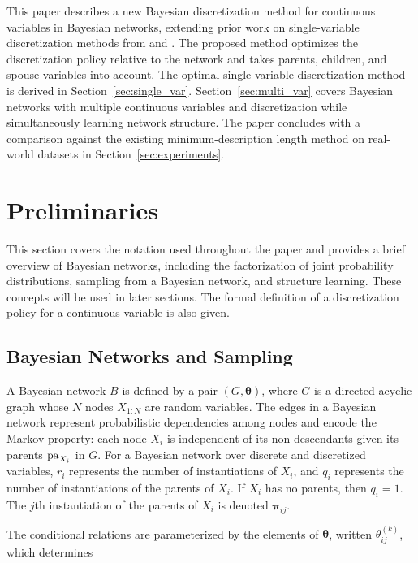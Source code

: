 This paper describes a new Bayesian discretization method for continuous variables in Bayesian networks, extending prior work on single-variable discretization methods from \citet{Boulle_2006} and \citet{Lustgarten_2011}.
The proposed method optimizes the discretization policy relative to the network and takes parents, children, and spouse variables into account.
The optimal single-variable discretization method is derived in Section~\ref{sec:single_var}.
Section~\ref{sec:multi_var} covers Bayesian networks with multiple continuous variables and discretization while simultaneously learning network structure.
The paper concludes with a comparison against the existing minimum-description length \citep{Friedman_1996} method on real-world datasets in Section~\ref{sec:experiments}.


\section{Preliminaries}
\label{sec:preliminaries}
This section covers the notation used throughout the paper and provides a brief overview of Bayesian networks, including the factorization of joint probability distributions, sampling from a Bayesian network, and structure learning.
These concepts will be used in later sections.
The formal definition of a discretization policy for a continuous variable is also given.

\subsection{Bayesian Networks and Sampling}

A Bayesian network $B$ is defined by a pair $(G,\bm{\theta})$, where $G$ is a directed acyclic graph whose $N$ nodes $X_{1:N}$ are random variables.
The edges in a Bayesian network represent probabilistic dependencies among nodes and encode the Markov property: each node $X_i$ is independent of its non-descendants given its parents $\operatorname{pa}_{X_i}$ in $G$.
For a Bayesian network over discrete and discretized variables, $r_i$ represents the number of instantiations of $X_i$, and $q_i$ represents the number of instantiations of the parents of $X_i$.
If $X_i$ has no parents, then $q_i = 1$.
The $j$th instantiation of the parents of $X_i$ is denoted $\bm{\pi}_{ij}$.

The conditional relations are parameterized by the elements of $\bm{\theta}$, written $\theta_{ij}^{(k)}$, which determines

